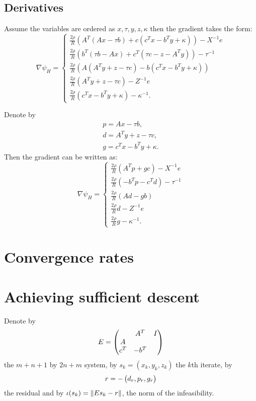 \documentclass{article}
\begin{document}
\subsection{Derivatives}
Assume the variables are ordered as $x,\tau,y,z,\kappa$ then the gradient takes the form:
\[
\nabla \psi_H = \begin{cases}
              \frac{2\rho}{R} \left(A^T(Ax-\tau b) + c(c^Tx-b^Ty + \kappa)\right) - X^{-1}e\\
              \frac{2\rho}{R} \left( b^T(\tau b-Ax)+c^T(\tau c - z- A^Ty) \right)  - \tau^{-1}\\
              \frac{2\rho}{R} \left(A(A^Ty+z-\tau c)-b(c^Tx-b^Ty + \kappa)\right)\\
              \frac{2\rho}{R} \left(A^Ty+z-\tau c\right)                              - Z^{-1}e\\
              \frac{2\rho}{R} \left(c^Tx-b^Ty+\kappa \right)  - \kappa^{-1}.
              \end{cases}
\]

Denote by 
\begin{align}
  p = Ax-\tau b,\\
  d = A^Ty + z - \tau c,\\
  g = c^Tx-b^Ty+\kappa.
  \label{eq:defres}
\end{align}
Then the gradient can be written as:
\[
\nabla \psi_H = \begin{cases}
              \frac{2\rho}{R} \left(A^Tp + gc\right) - X^{-1}e\\
              \frac{2\rho}{R} \left( -b^Tp-c^Td \right)  - \tau^{-1}\\
              \frac{2\rho}{R} \left(Ad-gb\right)\\
              \frac{2\rho}{R} d                               - Z^{-1}e\\
              \frac{2\rho}{R} g  - \kappa^{-1}.
              \end{cases}
\]



\section{Convergence rates}

\section{Achieving sufficient descent}
Denote by 
\[
E = \begin{pmatrix} & A^T & I \\
         A &     &   \\
         c^T&-b^T\end{pmatrix}
\] 
the $m+n+1$ by $2n+m$ system, by $s_k = (x_k,y_k,z_k)$ the $k$th iterate,
by
\[
r = -\begin{pmatrix}d_r,p_r,g_r\end{pmatrix}
\] the residual and by 
$\iota(s_k) = \left\| E s_k-r \right\|$, the norm of the infeasibility.
\end{document}

